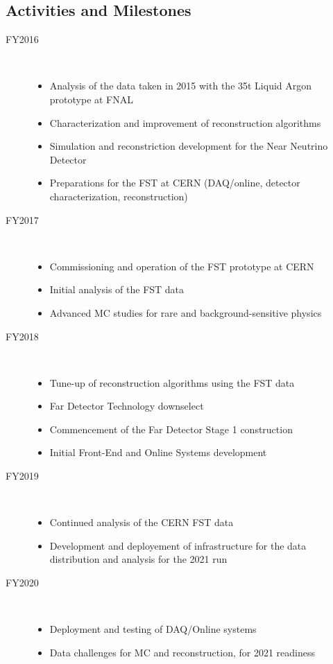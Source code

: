 \documentclass[pdftex,12pt,letter]{article}
\begin{document}
\subsection{Activities and Milestones}

\begin{description}
\item[FY2016] \
\begin{itemize}
\item Analysis of the data taken in 2015 with the 35t Liquid Argon prototype at FNAL
\item Characterization and improvement of reconstruction algorithms
\item Simulation and reconstriction development for the Near Neutrino Detector
\item Preparations for the FST at CERN (DAQ/online, detector characterization, reconstruction)
\end{itemize}
\item[FY2017] \
\begin{itemize}
\item  Commissioning and operation of the FST prototype at CERN
\item Initial analysis of the FST data
\item Advanced MC studies for rare and background-sensitive physics
\end{itemize}

\item[FY2018] \
\begin{itemize}
\item Tune-up of reconstruction algorithms using the FST data
\item Far Detector Technology downselect
\item Commencement of the Far Detector Stage 1 construction
\item Initial Front-End and Online Systems development
\end{itemize}

\item[FY2019] \
\begin{itemize}
\item Continued analysis of the CERN FST data
\item Development and deployement of infrastructure for the data distribution and analysis for the 2021 run
\end{itemize}

\item[FY2020] \
\begin{itemize}
\item Deployment and testing of DAQ/Online systems
\item Data challenges for MC and reconstruction, for 2021 readiness
\end{itemize}
\end{description}
\end{document}
